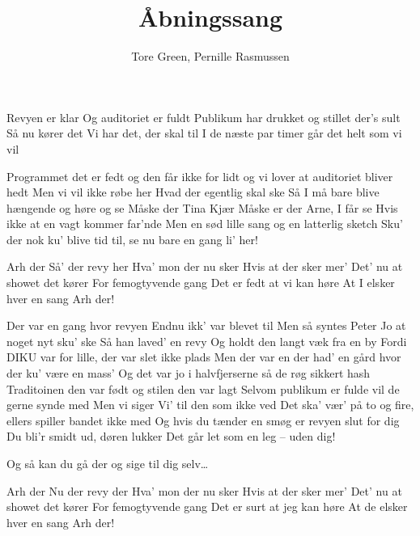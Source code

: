 \documentclass[11pt,a4paper]{article}
\title{Åbningssang}
\author{Tore Green, Pernille Rasmussen}
\begin{document}
\maketitle
\begin{song}
Revyen er klar
Og auditoriet er fuldt
Publikum har drukket
og stillet der's sult
Så nu kører det 
Vi har det, der skal til
I de næste par timer
går det helt som vi vil

Programmet det er fedt
og den får ikke for lidt
og vi lover
at auditoriet bliver hedt
Men vi vil ikke røbe her
Hvad der egentlig skal ske
Så I må bare blive hængende og høre og se
Måske der Tina Kjær
Måske er der Arne, I får se
Hvis ikke at en vagt kommer far'nde
Men en sød lille sang 
og en latterlig sketch
Sku' der nok ku' blive tid til, se nu bare en gang
li' her!

Arh der
Så' der revy her
Hva' mon der nu sker
Hvis at der sker mer'
Det' nu at showet det kører
For femogtyvende gang
Det er fedt at vi kan høre
At I elsker hver en sang
Arh der!

Der var en gang hvor revyen
Endnu ikk' var blevet til
Men så syntes Peter Jo at noget nyt sku' ske
Så han laved' en revy
Og holdt den langt væk fra en by
Fordi DIKU var for lille, der var slet ikke plads
Men der var en der had' en gård hvor der ku' være en mass'
Og det var jo i halvfjerserne så de røg sikkert hash
Traditoinen den var født og stilen den var lagt
Selvom publikum er fulde vil de gerne synde med
Men vi siger
Vi' til den som ikke ved
Det ska' vær' på to og fire, ellers spiller bandet ikke med
Og hvis du tænder en smøg er revyen slut for dig
Du bli'r smidt ud, døren lukker
Det går let som en leg -- uden dig!

Og så kan du gå der og sige til dig selv\ldots

Arh der
Nu der revy der
Hva' mon der nu sker
Hvis at der sker mer'
Det' nu at showet det kører
For femogtyvende gang
Det er surt at jeg kan høre
At de elsker hver en sang
Arh der!

\end{song}
\end{document}
